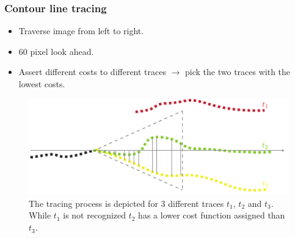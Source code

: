 \documentclass{beamer}
\begin{document}
\begin{frame}
    [fragile] \frametitle{Contour line tracing}
    \begin{itemize}
        \item Traverse image from left to right.
        \item 60 pixel look ahead.
        \item Assert different costs to different traces $\rightarrow$ pick the two traces with the lowest costs.
    \end{itemize}
    \begin{figure}
        [ht] \centering
        \includegraphics[width=0.79
        \textwidth]{../report/iris/trace} \caption{The tracing process is depicted for 3 different traces $t_1$, $t_2$ and $t_3$. While $t_1$ is not recognized $t_2$ has a lower cost function assigned than $t_3$.} \label{fig:trace}
    \end{figure}
\end{frame}
\end{document}
